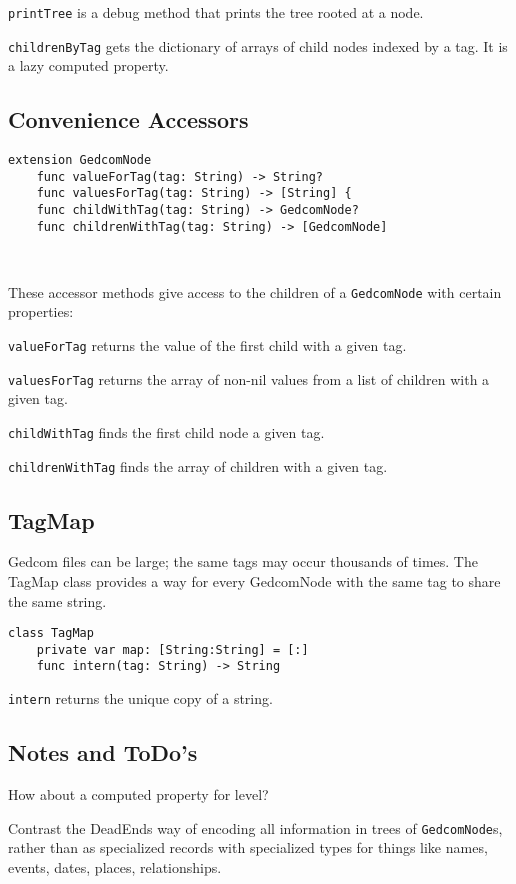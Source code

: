\texttt{printTree} is a debug method that prints the tree rooted at a node.

\texttt{childrenByTag} gets the dictionary of arrays of child nodes
indexed by a tag. It is a lazy computed property.
\subsection{Convenience Accessors}

\begin{verbatim}
extension GedcomNode
    func valueForTag(tag: String) -> String?
    func valuesForTag(tag: String) -> [String] {
    func childWithTag(tag: String) -> GedcomNode?
    func childrenWithTag(tag: String) -> [GedcomNode]
    
	
\end{verbatim}

These accessor methods give access to the children of a
\texttt{GedcomNode} with certain properties:

\texttt{valueForTag} returns the value of the first child with a given tag.

\texttt{valuesForTag} returns the array of non-nil values from a list of children with a given tag.

\texttt{childWithTag} finds the first child node a given tag.

\texttt{childrenWithTag} finds the array of children with a given tag.

\subsection{TagMap}
Gedcom files can be large; the same tags may occur thousands of times.
The TagMap class provides a way for every GedcomNode with the same tag
to share the same string.
\begin{verbatim}
class TagMap
    private var map: [String:String] = [:]
    func intern(tag: String) -> String
\end{verbatim}

\texttt{intern} returns the unique copy of a string.
\subsection{Notes and ToDo's}
How about a computed property for level?

Contrast the DeadEnds way of encoding all information in trees of
\texttt{GedcomNode}s, rather than as specialized records with specialized
types for things like names, events, dates, places, relationships.



